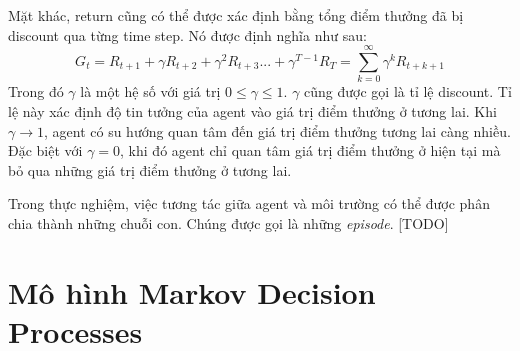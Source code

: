 	Mặt khác, return cũng có thể được xác định bằng tổng điểm thưởng đã bị discount qua từng time step. Nó được định nghĩa như sau:
	\begin{equation}
	\mathit{G_t} = \mathit{R_{t+1}} + \gamma\mathit{R_{t+2}} + \gamma^{2}\mathit{R_{t+3}}... + \gamma^{T-1}\mathit{R_{T}} = \sum_{k=0}^{\infty}\gamma^{k}\mathit{R_{t+k+1}}
	\end{equation}
	Trong đó $\gamma$ là một hệ số với giá trị $0\leqslant \gamma \leqslant 1$. $\gamma$ cũng được gọi là tỉ lệ discount. Tỉ lệ này xác định độ tin tưởng của agent vào giá trị điểm thưởng ở tương lai. Khi $\gamma \to 1$, agent có su hướng quan tâm đến giá trị điểm thưởng tương lai càng nhiều. Đặc biệt với $\gamma = 0$, khi đó agent chỉ quan tâm giá trị điểm thưởng ở hiện tại mà bỏ qua những giá trị điểm thưởng ở tương lai.
	
	Trong thực nghiệm, việc tương tác giữa agent và môi trường có thể được phân chia thành những chuỗi con. Chúng được gọi là những \textit{episode}. [TODO]
	
	
\section{Mô hình Markov Decision Processes}
